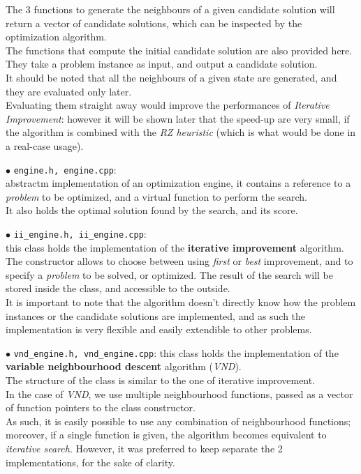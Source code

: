\documentclass[
12pt,
a4paper,
oneside,
headinclude,
footinclude]{article}
\theoremstyle{definition} %
\begin{document}
The 3 functions to generate the neighbours of a given candidate solution will return a vector of candidate solutions, which can be inspected by the optimization algorithm.\\
The functions that compute the initial candidate solution are also provided here. 
They take a problem instance as input, and output a candidate solution.\\
It should be noted that all the neighbours of a given state are generated, and they are evaluated only later.\\
Evaluating them straight away would improve the performances of \textit{Iterative Improvement}: however it will be shown later that the speed-up are very small, if the algorithm is combined with the \textit{RZ heuristic} (which is what would be done in a real-case usage).

$\bullet$ \texttt{engine.h, engine.cpp}:\\
abstractm implementation of an optimization engine, it contains a reference to a \textit{problem} to be optimized, and a virtual function to perform the search.\\
It also holds the optimal solution found by the search, and its score.

$\bullet$ \texttt{ii\_engine.h, ii\_engine.cpp}:\\
this class holds the implementation of the \textbf{iterative improvement} algorithm.\\
The constructor allows to choose between using \textit{first} or \textit{best} improvement, and to specify a \textit{problem} to be solved, or optimized.
The result of the search will be stored inside the class, and accessible to the outside.\\
It is important to note that the algorithm doesn't directly know how the problem instances or the candidate solutions are implemented, and as such the implementation is very flexible and easily extendible to other problems.

$\bullet$ \texttt{vnd\_engine.h, vnd\_engine.cpp}:
this class holds the implementation of the \textbf{variable neighbourhood descent} algorithm (\textit{VND}).\\
The structure of the class is similar to the one of iterative improvement.\\
In the case of \textit{VND}, we use multiple neighbourhood functions, passed as a vector of function pointers to the class constructor.\\
As such, it is easily possible to use any combination of neighbourhood functions; moreover, if a single function is given, the algorithm becomes equivalent to \textit{iterative search}. 
However, it was preferred to keep separate the 2 implementations, for the sake of clarity.
\end{document}
